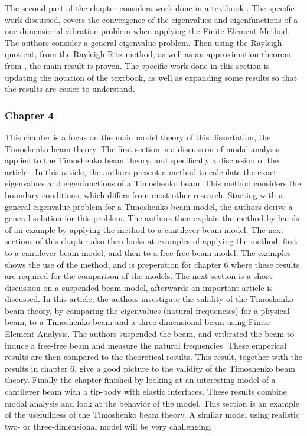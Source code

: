 \documentclass[../main.tex]{subfiles}
\begin{document}
The second part of the chapter considers work done in a textbook \cite{SF97}. The specific work discussed, covers the convergence of the eigenvalues and eigenfunctions of a one-dimensional vibration problem when applying the Finite Element Method. The authors consider a general eigenvalue problem. Then using the Rayleigh-quotient, from the Rayleigh-Ritz method, as well as an approximation theorem from \cite{OR97}, the main result is proven. The specific work done in this section is updating the notation of the textbook, as well as expanding some results so that the results are easier to understand.

\subsubsection{Chapter 4}
This chapter is a focus on the main model theory of this dissertation, the Timoshenko beam theory. The first section is a discussion of modal analysis applied to the Timoshenko beam theory, and specifically a discussion of the article \cite{VV06}. In this article, the authors present a method to calculate the exact eigenvalues and eigenfunctions of a Timoshenko beam. This method considers the boundary conditions, which differs from most other research. Starting with a general eigenvalue problem for a Timoshenko beam model, the authors derive a general solution for this problem. The authors then explain the method by hands of an example by applying the method to a cantilever beam model. The next sections of this chapter also then looks at examples of applying the method, first to a cantilever beam model, and then to a free-free beam model. The examples shows the use of the method, and is preperation for chapter 6 where these results are required for the comparison of the models. The next section is a short discussion on a suspended beam model, afterwards an important article \cite{SP06} is discussed. In this article, the authors investigate the validity of the Timoshenko beam theory, by comparing the eigenvalues (natural frequencies) for a physical beam, to a Timoshenko beam and a three-dimensional beam using Finite Element Analysis. The authors suspended the beam, and vribrated the beam to induce a free-free beam and measure the natural frequencies. These emperical results are then compared to the theoretical results. This result, together with the results in chapter 6, give a good picture to the validity of the Timoshenko beam theory. Finally the chapter finished by looking at an interesting model of a cantilever beam with a tip-body with elastic interfaces. These results combine modal analysis and look at the behavior of the model. This section is an example of the usefullness of the Timoshenko beam theory. A similar model using realistic two- or three-dimensional model will be very challenging.
\end{document}
